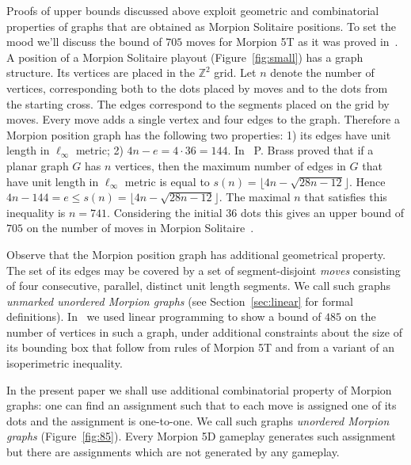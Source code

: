 Proofs of upper bounds discussed above exploit geometric and combinatorial properties of graphs that are obtained as Morpion Solitaire positions. 
To set the mood we'll discuss the bound of $705$ moves for Morpion 5T as it was proved in~\cite{demaine}.
A position of a Morpion Solitaire playout (Figure~\ref{fig:small}) has a graph structure.
Its vertices are placed in the $\mathbb{Z}^2$ grid.
Let $n$ denote the number of vertices, 
  corresponding both to the dots placed by moves and to the dots from the starting cross.
The edges correspond to the segments placed on the grid by moves.
Every move adds a single vertex and four edges to the graph.
Therefore a Morpion position graph has the following two properties: 1) its edges have unit length in $\ell_\infty$ metric; 2) $4n - e = 4 \cdot 36 = 144$.  
In~\cite{brass} P. Brass proved that if a planar graph $G$ has $n$ vertices, 
  then the maximum number of edges in $G$ that have unit length in $\ell_\infty$ metric is equal to
  $
    s(n) = \lfloor 4n - \sqrt{28n - 12} \rfloor.
  $
Hence
$
  4n - 144 = e \leq s(n) = \lfloor 4n - \sqrt{28n - 12} \rfloor.
$
The maximal $n$ that satisfies this inequality is $n = 741$. 
Considering the initial $36$ dots this gives an upper bound of $705$ on the number of moves 
  in Morpion Solitaire~\cite{demaine}.
  
Observe that the Morpion position graph has additional geometrical property.
The set of its edges may be covered by a set of segment-disjoint \emph{moves} consisting of four consecutive, parallel, distinct unit length segments. 
We call such graphs \emph{unmarked unordered Morpion graphs} (see Section~\ref{sec:linear} for formal definitions).
In~\cite{ijcai} we used linear programming to show a bound of $485$ on the number of vertices
  in such a graph, under additional constraints about the size of its bounding box 
   that follow from rules of Morpion 5T and from a variant of an isoperimetric inequality. 
  
In the present paper we shall use additional combinatorial property of Morpion graphs:
one can find an assignment such that to each move is assigned one of its dots and the assignment is one-to-one.
We call such graphs \emph{unordered Morpion graphs} (Figure~\ref{fig:85}). Every Morpion 5D gameplay generates such assignment but there are assignments 
which are not generated by any gameplay.
 
